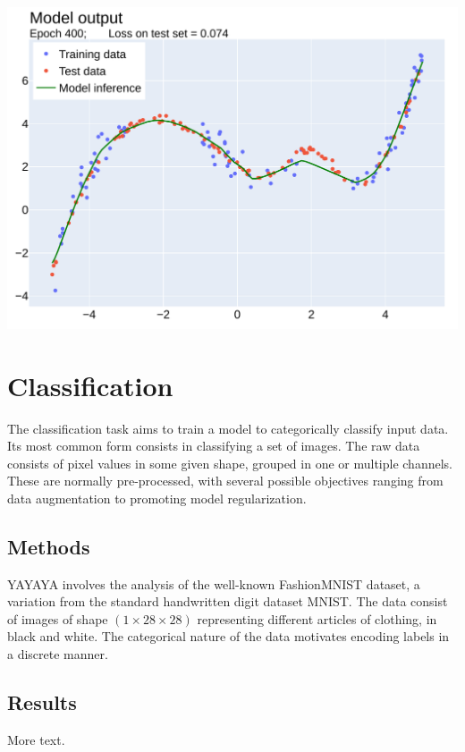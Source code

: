 \documentclass[11pt]{article} %
\newenvironment{Figure}{\par\medskip\noindent\minipage{\linewidth}}{\endminipage\par\medskip}
\begin{document}
\begin{multicols}{2}
\begin{Figure}
	\includegraphics[width=\linewidth]{res/fig4.pdf}
\end{Figure}

\section{Classification}
The classification task aims to train a model to categorically classify input data. Its most common form consists in classifying a set of images. The raw data consists of pixel values in some given shape, grouped in one or multiple channels. These are normally pre-processed, with several possible objectives ranging from data augmentation to promoting model regularization.

\subsection{Methods}
YAYAYA
involves the analysis of the well-known FashionMNIST dataset, a variation from the standard handwritten digit dataset MNIST. The data consist of images of shape $(1 \times 28 \times 28)$ representing different articles of clothing, in black and white. The categorical nature of the data motivates encoding labels in a discrete manner.\\
\subsection{Results}

More text.

\end{multicols}
\end{document}
